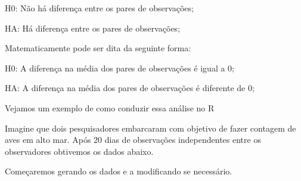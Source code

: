 \documentclass[]{book}
\begin{document}
H0: Não há diferença entre os pares de observações;

HA: Há diferença entre os pares de observações;

Matematicamente pode ser dita da seguinte forma:

H0: A diferença na média dos pares de observações é igual a 0;

HA: A diferença na média dos pares de observações é diferente de 0;

Vejamos um exemplo de como conduzir essa análise no R

Imagine que dois pesquisadores embarcaram com objetivo de fazer contagem de aves em alto mar. Após 20 dias de observações independentes entre os observadores obtivemos os dados abaixo.

Começaremos gerando os dados e a modificando se necessário.
\end{document}
